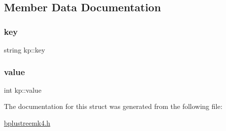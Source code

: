 \subsection{Member Data Documentation}
\mbox{\label{structkp_ab46106230758af92770fa00fd317e273}} 
\subsubsection{\texorpdfstring{key}{key}}
{\footnotesize\ttfamily string kp\+::key}

\mbox{\label{structkp_a743afbf5f8333e19be5ade0ed1a0caa4}} 
\subsubsection{\texorpdfstring{value}{value}}
{\footnotesize\ttfamily int kp\+::value}



The documentation for this struct was generated from the following file\+:\begin{DoxyCompactItemize}
\item 
\mbox{\hyperlink{bplustreemk4_8h}{bplustreemk4.\+h}}\end{DoxyCompactItemize}
